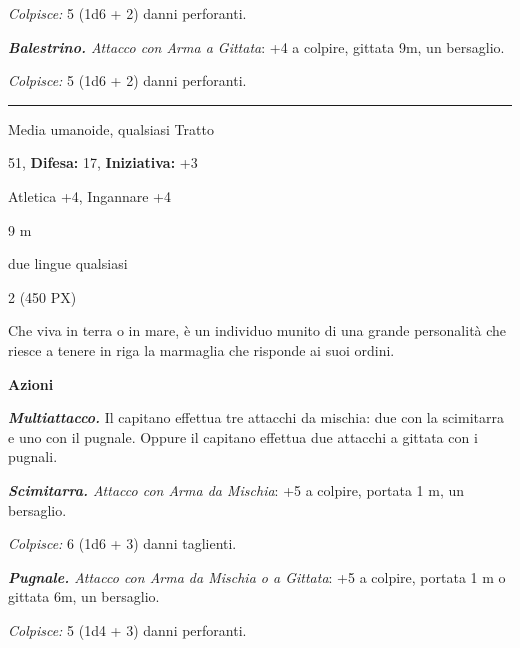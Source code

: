 \begin{multicols}{2}
{\emph{Colpisce:} 5 (1d6 + 2) danni perforanti.

\emph{\textbf{Balestrino.} Attacco con Arma a Gittata}: +4 a colpire, gittata 9m, un bersaglio.

\emph{Colpisce:} 5 (1d6 + 2) danni perforanti.

\smallskip\noindent\rule{\linewidth}{2pt}  \hypertarget{Capitano dei Banditi}{}\hypertarget{Capitano dei Pirati}{}\hypertarget{Capitano dei Banditi o Pirata}{}\smallskip {}
\begin{description}[noitemsep, topsep=0pt, parsep=0pt, partopsep=0pt, leftmargin=0cm, labelwidth=2.2cm]
    \item[\textbf{Taglia/Tipo:}] Media umanoide, qualsiasi Tratto
    \item[\textbf{Caratt.:}] 
    \item[\textbf{Punti Ferita:}] 51,  \textbf{Difesa:} 17,  \textbf{Iniziativa:} +3
    \item[\textbf{Comp.:}] Atletica +4, Ingannare +4
    \item[\textbf{Tiri Salvez.:}] 
    \item[\textbf{Movimento:}] 9 m
    \item[\textbf{Linguaggi:}]  due lingue qualsiasi
    \item[\textbf{Sfida:}] 2 (450 PX)\smallskip
\end{description}

Che viva in terra o in mare, è un individuo munito di una grande personalità che riesce a tenere in riga la marmaglia che risponde ai suoi ordini.

\textbf{Azioni}

\emph{\textbf{Multiattacco.}} Il capitano effettua tre attacchi da mischia: due con la scimitarra e uno con il pugnale. Oppure il capitano effettua due attacchi a gittata con i pugnali.

\emph{\textbf{Scimitarra.} Attacco con Arma da Mischia}: +5 a colpire, portata 1 m, un bersaglio.

\emph{Colpisce:} 6 (1d6 + 3) danni taglienti.

\emph{\textbf{Pugnale.} Attacco con Arma da Mischia o a Gittata}: +5 a colpire, portata 1 m o gittata 6m, un bersaglio.

\emph{Colpisce:} 5 (1d4 + 3) danni perforanti.

}
\end{multicols}
